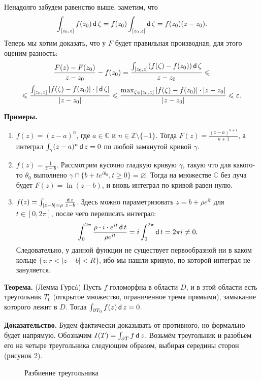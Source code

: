 Ненадолго забудем равенство выше, заметим, что
\[
    \int_{[z_0, z]} f(z_0) \operatorname{\mathsf d} \zeta = f(z_0) \int_{[z_0, z]} \operatorname{\mathsf d} \zeta = f(z_0)(z - z_0).
\]
Теперь мы хотим доказать, что у $F$ будет правильная производная, для этого оценим разность:
\[
    \frac{F(z) - F(z_0)}{z - z_0} - f(z_0) = \frac{\int_{[z_0, z]} (f(\zeta) - f(z_0)) \operatorname{\mathsf d} \zeta}{z - z_0} \leqslant
\]
\[
    \leqslant \frac{\int_{[z_0, z]} |f(\zeta) - f(z_0)| \cdot |\operatorname{\mathsf d} \zeta|}{|z - z_0|} \leqslant \frac{\max_{\zeta \in [z_0, z]} |f(\zeta) - f(z_0)| \cdot |z - z_0|}{|z - z_0|} \leqslant \varepsilon.
\]

\QED

\textbf{Примеры.}
\begin{enumerate}
    \item $f(z) = (z - a)^n$, где $a \in \mathbb C$ и $n \in \mathbb Z \setminus \{-1\}$.
        Тогда $F(z) = \frac{(z - a)^{n+1}}{n+1}$, а интеграл $\int_\gamma (z - a)^n \operatorname{\mathsf d} z = 0$ по любой замкнутой кривой $\gamma$.

    \item $f(z) = \frac{1}{z - b}$. Рассмотрим кусочно гладкую кривую $\gamma$, такую что для какого-то $\theta_0$ выполнено $\gamma \cap \{b + te^{i \theta_0}, t \ge 0\} = \varnothing$.
        Тогда на множестве $\mathbb C$ без луча будет $F(z) = \ln(z - b)$, и вновь интеграл по кривой равен нулю.

    \item $f(z) = \int_{|z - b| = \rho} \frac{\operatorname{\mathsf d} z}{z - b}$.
        Здесь можно параметризовать $z = b + \rho e^{it}$ для $t \in [0, 2\pi]$, после чего переписать интеграл:
        \[
            \int_0^{2\pi} \frac{\rho \cdot i \cdot e^{it} \operatorname{\mathsf d} t}{\rho e^{it}} = i \int_0^{2\pi} \operatorname{\mathsf d} t = 2\pi i \ne 0.
        \]
        Следовательно, у данной функции не существует первообразной ни в каком кольце $\{z: r < |z - b| < R\}$, ибо мы нашли кривую, по которой интеграл не зануляется.
\end{enumerate}

\textbf{Теорема.} (Лемма Гурсá) Пусть $f$ голоморфна в области $D$, и в этой области есть треугольник $T_0$ (открытое множество, ограниченное тремя прямыми), замыкание которого лежит в $D$.
Тогда $\int_{\partial T_0} f(z) \operatorname{\mathsf d} z = 0$.

\textbf{Доказательство.} Будем фактически доказывать от противного, но формально будет напрямую.
Обозначим $I(T) = \int_{\partial T} f \operatorname{\mathsf d} z$.
Возьмём треугольник и разобьём его на четыре треугольника следующим образом, выбирая середины сторон (рисунок 2).
\begin{figure}[ht]
    \centering
    \caption{Разбиение треугольника}
\end{figure}

